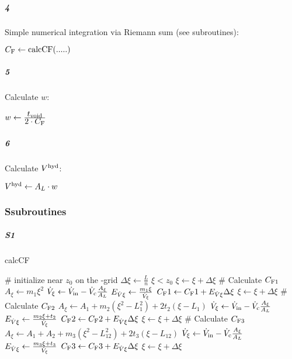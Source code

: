 \subparagraph{4}
Simple numerical integration via Riemann sum (see subroutines):
\begin{algorithmic}
  \State $C_\text{F} \leftarrow \text{calcCF}(.....)$
\end{algorithmic}
\subparagraph{5}
Calculate $w$:
\begin{algorithmic}
\State $w \leftarrow \frac{\displaystyle t_\text{void}}{\displaystyle 2\cdot C_\text{F}} $
\end{algorithmic}
\begin{comment}
\subparagraph{7}
Calculate passed channel area $A$:
\begin{algorithmic}
  \If{$ z_0 \geqq L_1$}
\State  $ A_z \leftarrow (L_{12} - z_0)\cdot( m_2  (L_{12} + z_0) + t_2 ) +  A_3$
\Else
\State  $ A_z \leftarrow  m_1 \cdot (L_1^2 - z_0^2) + A_2 + A_3 $
\EndIf
\end{algorithmic}
\end{comment}

\subparagraph{6}
Calculate $V^\text{hyd}$:
\begin{algorithmic}
  \State $V^\text{hyd} \leftarrow A_L \cdot w$
\end{algorithmic}
\clearpage
\subsubsection*{S\quad subroutines}
\vspace*{-1.2ex}
\subparagraph{S1} calcCF
\vspace*{-1.2ex}
\begin{algorithmic}
  \State \tiny \# initialize \xi near $z_0$ on the \xi-grid \normalsize
  \State $\Delta\xi \leftarrow \frac{L}{n}$
  \State $\xi < z_0$
  \State $\xi \leftarrow \xi + \Delta\xi$
  \EndWhile
  \State \tiny \# Calculate $C_\text{F1}$ \normalsize
  \State  $A_\xi \leftarrow m_1 \xi^2 $
  \State $ \dot{V}_\xi \leftarrow \dot{V}_\text{in} - \dot{V}_\text{c} \frac{A_\xi}{A_L} $ 
  \State $E_{\dot{V}\xi} \leftarrow \frac{m_1\xi}{\dot{V}_\xi} $
  \State $C_\text{F}1 \leftarrow C_\text{F}1 + E_{\dot{V}\xi} \Delta\xi$
  \State $\xi \leftarrow \xi + \Delta\xi$
  \EndWhile
  \State \tiny \#  Calculate $C_\text{F2}$ \normalsize
  \State $A_\xi \leftarrow A_1 + m_2 \left( \xi^2 - L_1^2 \right) + 2 t_2\left(\xi - L_1\right) $
  \State $ \dot{V}_\xi \leftarrow \dot{V}_\text{in} - \dot{V}_\text{c} \frac{A_\xi}{A_L} $ 
  \State $E_{\dot{V}\xi} \leftarrow \frac{m_2\xi + t_2}{\dot{V}_\xi} $
  \State $C_\text{F}2 \leftarrow C_\text{F}2 + E_{\dot{V}\xi} \Delta\xi$
  \State $\xi \leftarrow \xi + \Delta\xi$
  \EndWhile
  \State \tiny \#  Calculate $C_\text{F3}$ \normalsize
  \State $A_\xi \leftarrow A_1 + A_2 + m_3 \left( \xi^2 - L_{12}^2 \right) + 2 t_3\left(\xi - L_{12}\right) $
  \State $ \dot{V}_\xi \leftarrow \dot{V}_\text{in} - \dot{V}_\text{c} \frac{A_\xi}{A_L} $ 
  \State $E_{\dot{V}\xi} \leftarrow \frac{m_3\xi + t_3}{\dot{V}_\xi} $
  \State $C_\text{F}3 \leftarrow C_\text{F}3 + E_{\dot{V}\xi} \Delta\xi $
  \State $\xi \leftarrow \xi + \Delta\xi $
  \EndWhile
\end{algorithmic}
\vspace*{-2.0ex}
